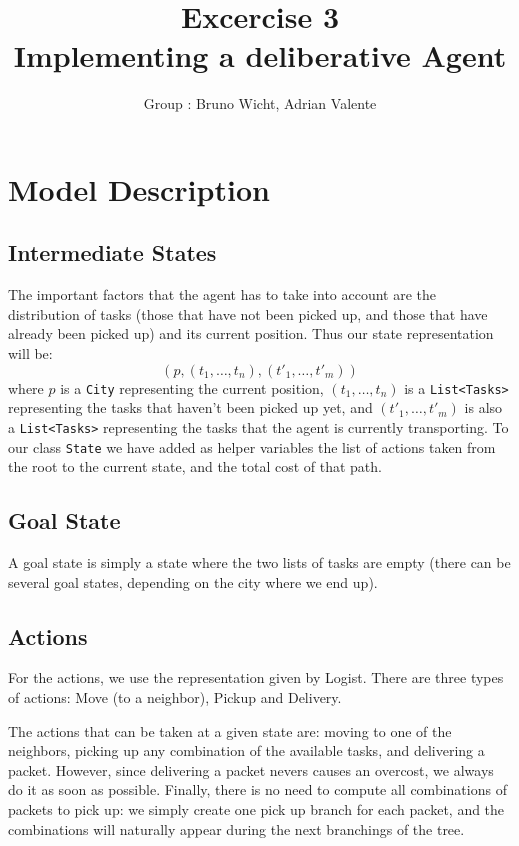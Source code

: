\documentclass[11pt]{article}
\title{\bf Excercise 3\\ Implementing a deliberative Agent}
\author{Group \textnumero : Bruno Wicht, Adrian Valente}
\begin{document}
\maketitle

\section{Model Description}

\subsection{Intermediate States}
The important factors that the agent has to take into account are the distribution of tasks (those that have not been picked up, and those that have already been picked up) and its current position. Thus our state representation will be:
$$ (p, (t_1,\dots,t_n), (t'_1,\dots,t'_m)) $$
where $p$ is a \texttt{City} representing the current position, $(t_1,\dots,t_n)$ is a \texttt{List<Tasks>} representing the tasks that haven't been picked up yet, and $(t'_1,\dots,t'_m)$ is also a \texttt{List<Tasks>} representing the tasks that the agent is currently transporting. To our class \texttt{State} we have added as helper variables the list of actions taken from the root to the current state, and the total cost of that path.

\subsection{Goal State}
A goal state is simply a state where the two lists of tasks are empty (there can be several goal states, depending on the city where we end up). 

\subsection{Actions}
For the actions, we use the representation given by Logist. There are three types of actions: Move (to a neighbor), Pickup and Delivery. 

The actions that can be taken at a given state are: moving to one of the neighbors, picking up any combination of the available tasks, and delivering a packet. However, since delivering a packet nevers causes an overcost, we always do it as soon as possible. Finally, there is no need to compute all combinations of packets to pick up: we simply create one pick up branch for each packet, and the combinations will naturally appear during the next branchings of the tree.
\end{document}
